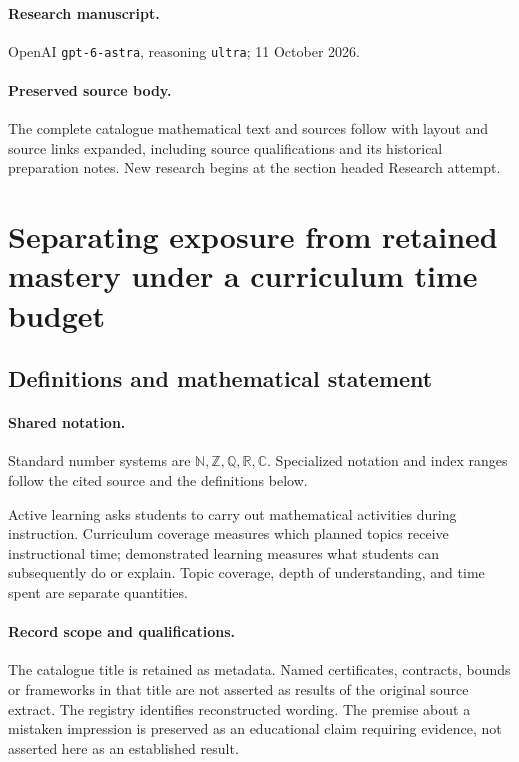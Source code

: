 \documentclass[11pt]{article}
\begin{document}
\paragraph{Research manuscript.} OpenAI \texttt{gpt-6-astra}, reasoning \texttt{ultra}; 11 October 2026.
\paragraph{Preserved source body.} The complete catalogue mathematical text and sources follow with layout and source links expanded, including source qualifications and its historical preparation notes. New research begins at the section headed Research attempt.

\section{Separating exposure from retained mastery under a curriculum time budget}\label{statement}

\subsection{Definitions and mathematical statement}

\paragraph{Shared notation.}Standard number systems are $\mathbb N,\mathbb Z,\mathbb Q,\mathbb R,\mathbb C$. Specialized notation and index ranges follow the cited source and the definitions below.


Active learning asks students to carry out mathematical activities during instruction. Curriculum coverage measures which planned topics receive instructional time; demonstrated learning measures what students can subsequently do or explain. Topic coverage, depth of understanding, and time spent are separate quantities.
\paragraph{Record scope and qualifications.}
The catalogue title is retained as metadata. Named certificates, contracts, bounds or frameworks in that title are not asserted as results of the original source extract.
The registry identifies reconstructed wording. The premise about a mistaken impression is preserved as an educational claim requiring evidence, not asserted here as an established result.
\end{document}
